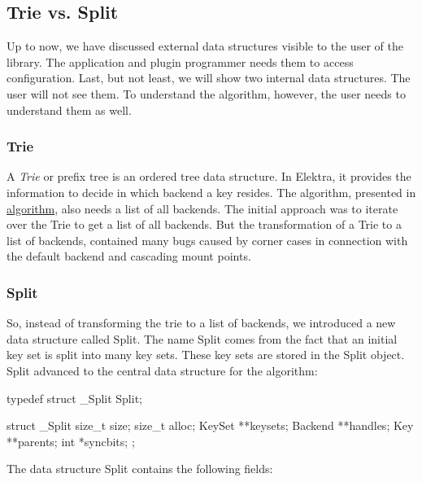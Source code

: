 \subsection*{Trie vs. Split}

Up to now, we have discussed external data structures visible to the user of the library. The application and plugin programmer needs them to access configuration. Last, but not least, we will show two internal data structures. The user will not see them. To understand the algorithm, however, the user needs to understand them as well.

\subsubsection*{Trie}

A {\itshape Trie} or prefix tree is an ordered tree data structure. In Elektra, it provides the information to decide in which backend a key resides. The algorithm, presented in \hyperlink{md_doc_help_elektra-algorithm_doc_help_elektra-algorithm_md}{algorithm}, also needs a list of all backends. The initial approach was to iterate over the {\ttfamily Trie} to get a list of all backends. But the transformation of a {\ttfamily Trie} to a list of backends, contained many bugs caused by corner cases in connection with the default backend and cascading mount points.

\subsubsection*{Split}

So, instead of transforming the trie to a list of backends, we introduced a new data structure called {\ttfamily Split}. The name {\ttfamily Split} comes from the fact that an initial key set is split into many key sets. These key sets are stored in the {\ttfamily Split} object. {\ttfamily Split} advanced to the central data structure for the algorithm\+: \begin{DoxyVerb}    typedef struct _Split   Split;

    struct _Split {
            size_t size;
            size_t alloc;
            KeySet **keysets;
            Backend **handles;
            Key **parents;
            int *syncbits;
    };
\end{DoxyVerb}


The data structure {\ttfamily Split} contains the following fields\+:


